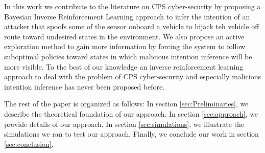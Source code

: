 \documentclass[letterpaper, 10 pt, conference]{ieeeconf}  %
\begin{document}
In this work we contribute to the literature on CPS cyber-security by proposing a Bayesian Inverse Reinforcement Learning approach to infer the intention of an attacker that spoofs some of the sensor onboard a vehicle to hijack teh vehicle off route toward undesired states in the environment. We also propose an active exploration method to gain more information by forcing the system to follow suboptimal policies toward states in which malicious intention inference will be more visible.
To the best of our knowledge an inverse reinforcement learning approach to deal with the problem of CPS cyber-security and especially malicious intention inference has never been proposed before.
%

The rest of the paper is organized as follows: In section \ref{sec:Preliminaries}, we describe the theoretical foundation of our approach. In section \ref{sec:approach}, we provide details of our approach. In section \ref{sec:simulations}, we illustrate the simulations we ran to test our approach. Finally, we conclude our work in section \ref{sec:conclusion}.
\end{document}
